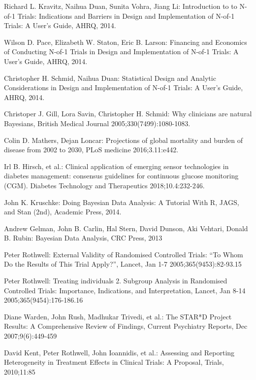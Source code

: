 \documentclass[12pt,a4paper,leqno]{report}
\theoremstyle{plain}
\theoremstyle{definition}
\theoremstyle{remark}
\begin{document}
\begin{thebibliography}{4}

    Richard L. Kravitz, Naihua Duan, Sunita Vohra, Jiang Li: Introduction to to
    N-of-1 Trials: Indications and Barriers in Design and Implementation of
    N-of-1 Trials: A User's Guide, AHRQ, 2014.

    Wilson D. Pace, Elizabeth W. Staton, Eric B. Larson: Financing and Economics
    of Conducting N-of-1 Trials in Design and Implementation of N-of-1 Trials: A
    User's Guide, AHRQ, 2014.

    Christopher H. Schmid, Naihua Duan: Statistical Design and Analytic
    Considerations in Design and Implementation of N-of-1 Trials: A User's
    Guide, AHRQ, 2014.

    Christoper J. Gill, Lora Savin, Christopher H. Schmid: Why clinicians are
    natural Bayesians, British Medical Journal 2005;330(7499):1080-1083.

    Colin D. Mathers, Dejan Loncar: Projections of global mortality and burden
    of disease from 2002 to 2030, PLoS medicine 2016;3.11:e442.

    Irl B. Hirsch, et al.: Clinical application of emerging sensor technologies
    in diabetes management: consensus guidelines for continuous glucose
    monitoring (CGM). Diabetes Technology and Therapeutics 2018;10.4:232-246.

    John K. Kruschke: Doing Bayesian Data Analysis: A Tutorial With R, JAGS, and Stan
    (2nd), Academic Press, 2014.

    Andrew Gelman, John B. Carlin, Hal Stern, David Dunson, Aki Vehtari, Donald B.
    Rubin: Bayesian Data Analysis, CRC Press, 2013

    Peter Rothwell: External Validity of Randomised Controlled Trials: “To Whom Do the
    Results of This Trial Apply?”, Lancet, Jan 1-7 2005;365(9453):82-93.15

    Peter Rothwell: Treating individuals 2. Subgroup Analysis in Randomised Controlled
    Trials: Importance, Indications, and Interpretation, Lancet, Jan 8-14
    2005;365(9454):176-186.16

    Diane Warden, John Rush, Madhukar Trivedi, et al.: The STAR*D Project Results: A Comprehensive Review of Findings, Current Psychiatry Reports, Dec 2007;9(6):449-459

    David Kent, Peter Rothwell, John Ioannidis, et al.: Assessing and Reporting Heterogeneity in
    Treatment Effects in Clinical Trials: A Proposal, Trials, 2010;11:85

\end{thebibliography}
\end{document}
